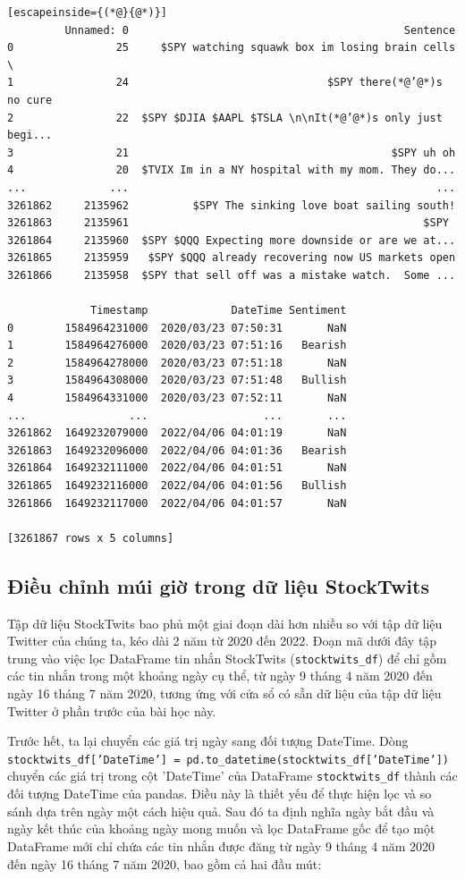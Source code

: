 \begin{lstlisting}[escapeinside={(*@}{@*)}]
         Unnamed: 0                                           Sentence   
0                25     $SPY watching squawk box im losing brain cells  \
1                24                               $SPY there(*@’@*)s no cure   
2                22  $SPY $DJIA $AAPL $TSLA \n\nIt(*@’@*)s only just begi...   
3                21                                         $SPY uh oh   
4                20  $TVIX Im in a NY hospital with my mom. They do...   
...             ...                                                ...   
3261862     2135962          $SPY The sinking love boat sailing south!   
3261863     2135961                                              $SPY    
3261864     2135960  $SPY $QQQ Expecting more downside or are we at...   
3261865     2135959   $SPY $QQQ already recovering now US markets open   
3261866     2135958  $SPY that sell off was a mistake watch.  Some ...   

             Timestamp             DateTime Sentiment  
0        1584964231000  2020/03/23 07:50:31       NaN  
1        1584964276000  2020/03/23 07:51:16   Bearish  
2        1584964278000  2020/03/23 07:51:18       NaN  
3        1584964308000  2020/03/23 07:51:48   Bullish  
4        1584964331000  2020/03/23 07:52:11       NaN  
...                ...                  ...       ...  
3261862  1649232079000  2022/04/06 04:01:19       NaN  
3261863  1649232096000  2022/04/06 04:01:36   Bearish  
3261864  1649232111000  2022/04/06 04:01:51       NaN  
3261865  1649232116000  2022/04/06 04:01:56   Bullish  
3261866  1649232117000  2022/04/06 04:01:57       NaN  

[3261867 rows x 5 columns]
\end{lstlisting}

\subsection{Điều chỉnh múi giờ trong dữ liệu StockTwits}

Tập dữ liệu StockTwits bao phủ một giai đoạn dài hơn nhiều so với tập dữ liệu Twitter của chúng ta, kéo dài 2 năm từ 2020 đến 2022. Đoạn mã dưới đây tập trung vào việc lọc DataFrame tin nhắn StockTwits (\texttt{stocktwits\_df}) để chỉ gồm các tin nhắn trong một khoảng ngày cụ thể, từ ngày 9 tháng 4 năm 2020 đến ngày 16 tháng 7 năm 2020, tương ứng với cửa sổ có sẵn dữ liệu của tập dữ liệu Twitter ở phần trước của bài học này.

Trước hết, ta lại chuyển các giá trị ngày sang đối tượng DateTime. Dòng \texttt{stocktwits\_df['DateTime'] = pd.to\_datetime(stocktwits\_df['DateTime'])} chuyển các giá trị trong cột 'DateTime' của DataFrame \texttt{stocktwits\_df} thành các đối tượng DateTime của pandas. Điều này là thiết yếu để thực hiện lọc và so sánh dựa trên ngày một cách hiệu quả. Sau đó ta định nghĩa ngày bắt đầu và ngày kết thúc của khoảng ngày mong muốn và lọc DataFrame gốc để tạo một DataFrame mới chỉ chứa các tin nhắn được đăng từ ngày 9 tháng 4 năm 2020 đến ngày 16 tháng 7 năm 2020, bao gồm cả hai đầu mút:

